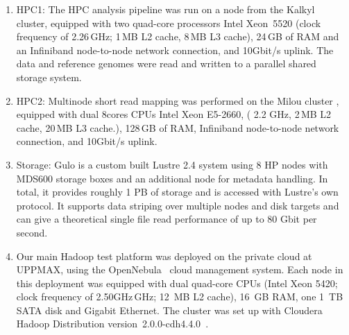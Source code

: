 \documentclass[11pt, oneside]{article}   	%
\begin{document}
\begin{enumerate}
\item  HPC1:
The HPC analysis pipeline was run on a node from the Kalkyl~\cite{kalkyl} cluster, equipped with two quad-core processors Intel Xeon~5520 (clock frequency of 2.26\,GHz; 1\,MB L2 cache, 8\,MB L3 cache), 24\,GB of RAM and an Infiniband node-to-node network connection, and 10Gbit/s uplink. The data and reference genomes were read and written to a parallel shared storage system. 

\item 
HPC2:
Multinode short read mapping was performed on the Milou cluster\cite{milouCluster} , equipped with dual 8cores CPUs Intel Xeon E5-2660, ( 2.2 GHz, 2\,MB L2 cache, 20\,MB L3 cache.), 128\,GB of RAM, Infiniband node-to-node network connection, and 10Gbit/s uplink.

\item Storage: 
Gulo\cite{gulo} is a custom built Lustre 2.4 system using 8 HP nodes with MDS600 storage boxes and an additional node for metadata handling. In total, it provides roughly 1 PB of storage and is accessed with Lustre's own protocol. It supports data striping over multiple nodes and disk targets and can give a theoretical single file read performance of up to 80 Gbit per second.

\item Our main Hadoop test platform was deployed on the private cloud at UPPMAX, using the OpenNebula~\cite{opennebula} cloud management system. Each node in this deployment was equipped with dual quad-core CPUs (Intel Xeon 5420; clock frequency of 2.50GHz\,GHz; 12~MB L2 cache), 16~GB RAM, one 1~TB SATA disk and Gigabit Ethernet. The cluster was set up with Cloudera Hadoop Distribution version~2.0.0-cdh4.4.0~\cite{cloudera}.

\end{enumerate}



\end{document}
